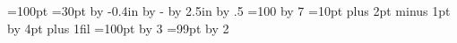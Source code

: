 
=100pt =30pt
\advance{} by -0.4in
\advance{} by -
\advance{} by 2.5in
\advance{} by .5
=100 \advance{} by 7
=10pt plus 2pt minus 1pt \advance{} by 4pt plus 1fil
=100pt \multiply{} by 3
=99pt \divide{} by 2
\bye
